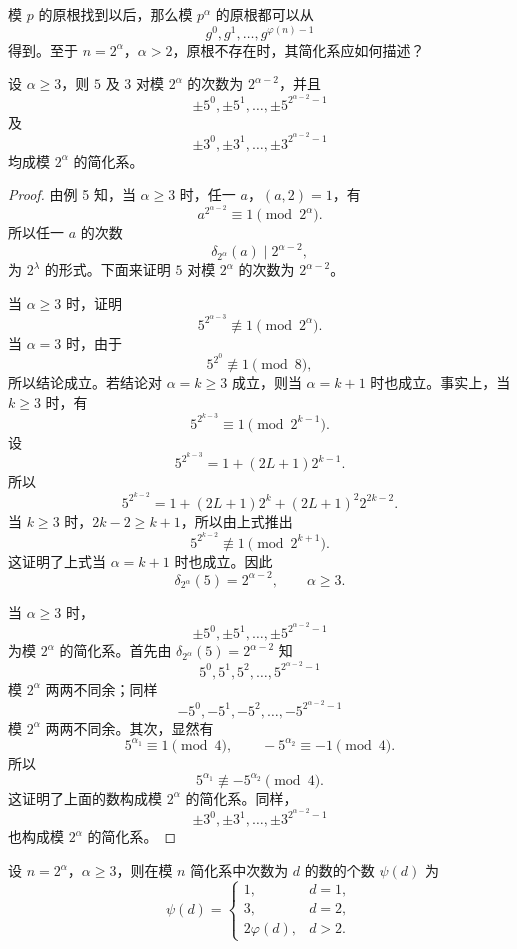 模 $p$ 的原根找到以后，那么模 $p^\alpha$ 的原根都可以从
\[
	g^0,g^1,\ldots,g^{\varphi(n)-1}
\]
得到。至于 $n=2^\alpha$，$\alpha>2$，原根不存在时，其简化系应如何描述？

\begin{theorem}[原文 定理 13]
	设 $\alpha\geq 3$，则 $5$ 及 $3$ 对模 $2^\alpha$ 的次数为 $2^{\alpha-2}$，并且
	\[
		\pm 5^0,\pm 5^1,\ldots,\pm 5^{2^{\alpha-2}-1}
	\]
	及
	\[
		\pm 3^0,\pm 3^1,\ldots,\pm 3^{2^{\alpha-2}-1}
	\]
	均成模 $2^\alpha$ 的简化系。
\end{theorem}

\begin{proof}
	由例 5 知，当 $\alpha\geq 3$ 时，任一 $a$，$(a,2)=1$，有
	\[
		a^{2^{\alpha-2}}\equiv 1\pmod {2^\alpha}.
	\]
	所以任一 $a$ 的次数
	\[
		\delta_{2^\alpha}(a)\mid 2^{\alpha-2},
	\]
	为 $2^\lambda$ 的形式。下面来证明 $5$ 对模 $2^\alpha$ 的次数为 $2^{\alpha-2}$。

	当 $\alpha\geq 3$ 时，证明
	\[
		5^{2^{\alpha-3}}\not\equiv 1\pmod {2^\alpha}.
	\]
	当 $\alpha=3$ 时，由于
	\[
		5^{2^0}\not\equiv 1\pmod 8,
	\]
	所以结论成立。若结论对 $\alpha=k\geq 3$ 成立，则当 $\alpha=k+1$ 时也成立。事实上，当 $k\geq 3$ 时，有
	\[
		5^{2^{k-3}}\equiv 1\pmod {2^{k-1}}.
	\]
	设
	\[
		5^{2^{k-3}}=1+(2L+1)2^{k-1}.
	\]
	所以
	\[
		5^{2^{k-2}}
		=
		1+(2L+1)2^k+(2L+1)^2 2^{2k-2}.
	\]
	当 $k\geq 3$ 时，$2k-2\geq k+1$，所以由上式推出
	\[
		5^{2^{k-2}}\not\equiv 1\pmod {2^{k+1}}.
	\]
	这证明了上式当 $\alpha=k+1$ 时也成立。因此
	\[
		\delta_{2^\alpha}(5)=2^{\alpha-2},
		\qquad \alpha\geq 3.
	\]

	当 $\alpha\geq 3$ 时，
	\[
		\pm 5^0,\pm 5^1,\ldots,\pm 5^{2^{\alpha-2}-1}
	\]
	为模 $2^\alpha$ 的简化系。首先由 $\delta_{2^\alpha}(5)=2^{\alpha-2}$ 知
	\[
		5^0,5^1,5^2,\ldots,5^{2^{\alpha-2}-1}
	\]
	模 $2^\alpha$ 两两不同余；同样
	\[
		-5^0,-5^1,-5^2,\ldots,-5^{2^{\alpha-2}-1}
	\]
	模 $2^\alpha$ 两两不同余。其次，显然有
	\[
		5^{\alpha_1}\equiv 1\pmod 4,
		\qquad
		-5^{\alpha_2}\equiv -1\pmod 4.
	\]
	所以
	\[
		5^{\alpha_1}\not\equiv -5^{\alpha_2}\pmod 4.
	\]
	这证明了上面的数构成模 $2^\alpha$ 的简化系。同样，
	\[
		\pm 3^0,\pm 3^1,\ldots,\pm 3^{2^{\alpha-2}-1}
	\]
	也构成模 $2^\alpha$ 的简化系。
\end{proof}

\begin{theorem}[原文 定理 14]
	设 $n=2^\alpha$，$\alpha\geq 3$，则在模 $n$ 简化系中次数为 $d$ 的数的个数 $\psi(d)$ 为
	\[
		\psi(d)=
		\begin{cases}
			1, & d=1,\\
			3, & d=2,\\
			2\varphi(d), & d>2.
		\end{cases}
	\]
\end{theorem}

